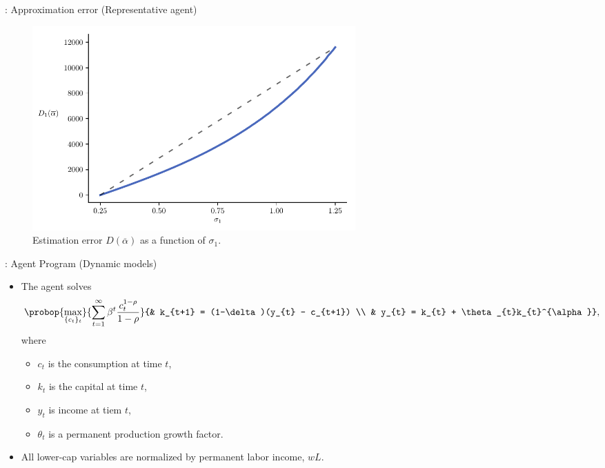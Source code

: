 \documentclass[10pt, handout]{beamer}
\begin{document}
\begin{frame}[label=Dt-RA,plain,noframenumbering]{\secname: Approximation error (Representative agent)\,\hyperlink{RA-Example}{\beamerreturnbutton} }
	\begin{figure}[H] 
		\caption{Estimation error $D(\overline{\alpha})$ as a function of $\sigma_{1}$.}
		\label{fig:RADiffPlot}
		\includegraphics[width = 0.6\textwidth]{RAdiffPlot}
	\end{figure}
\end{frame}

\begin{frame}[label=Carroll-Program, plain, noframenumbering]{\secname: Agent Program (Dynamic models)\,\hyperlink{Carroll-Model}{\beamerreturnbutton}}
	\vfill
	\begin{itemize}
		\item The agent solves \vspace{2ex}
				$$\probop{\max_{\{c_{t}\}_{t}}}{\sum_{t=1}^{\infty} \beta^{t}\frac{c_{t}^{1-\rho}}{1-\rho}}
					{&	k_{t+1} = (1-\delta)(y_{t} - c_{t+1})	\\
					&	y_{t} = k_{t} + \theta_{t}k_{t}^{\alpha}},$$
			where \vspace{1ex}
			\begin{itemize}
				\item $c_{t}$ is the consumption at time $t$, \vspace{1ex}
				\item $k_{t}$ is the capital at time $t$, \vspace{1ex}
				\item $y_{t}$ is income at tiem $t$, \vspace{1ex}
				\item $\theta_{t}$ is a permanent production growth factor. 
			\end{itemize} \vfill
			
		\item All lower-cap variables are normalized by permanent labor income, $wL$.
	\end{itemize}

\end{frame}
\end{document}
